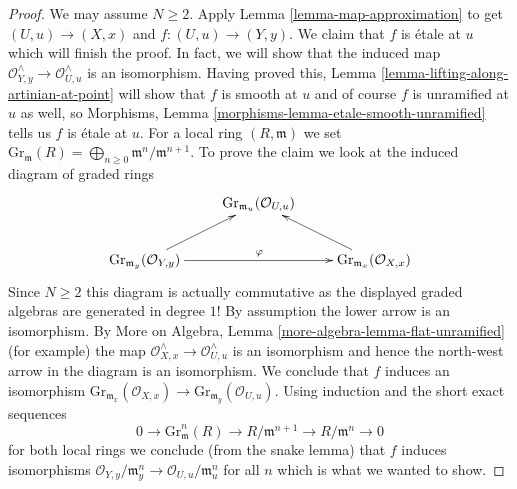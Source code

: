 \documentclass[10pt,a4paper]{amsart}
\theoremstyle{plain}
\theoremstyle{definition}
\theoremstyle{remark}
\numberwithin{equation}{subsection}
\begin{document}
\begin{proof}
We may assume $N \geq 2$. Apply Lemma \ref{lemma-map-approximation} to get
$(U, u) \to (X, x)$ and $f : (U, u) \to (Y, y)$.
We claim that $f$ is \'etale at $u$ which will finish the proof.
In fact, we will show that the induced map
$\mathcal{O}_{Y, y}^\wedge \to \mathcal{O}_{U, u}^\wedge$
is an isomorphism. Having proved this,
Lemma \ref{lemma-lifting-along-artinian-at-point}
will show that $f$ is smooth at $u$ and of course
$f$ is unramified at $u$ as well, so
Morphisms, Lemma \ref{morphisms-lemma-etale-smooth-unramified}
tells us $f$ is \'etale at $u$.
For a local ring $(R, \mathfrak m)$ we set
$\text{Gr}_\mathfrak m(R) =
\bigoplus_{n \geq 0} \mathfrak m^n/\mathfrak m^{n + 1}$.
To prove the claim we look at the induced diagram
of graded rings
$$
\xymatrix{
& \text{Gr}_{\mathfrak m_u}(\mathcal{O}_{U, u}) \\
\text{Gr}_{\mathfrak m_y}(\mathcal{O}_{Y, y}) \ar[rr]^\varphi \ar[ru] & &
\text{Gr}_{\mathfrak m_x}(\mathcal{O}_{X, x}) \ar[lu]
}
$$
Since $N \geq 2$ this diagram is actually commutative as the
displayed graded algebras are generated in degree $1$!
By assumption the lower arrow is an isomorphism.
By More on Algebra, Lemma \ref{more-algebra-lemma-flat-unramified}
(for example) the map
$\mathcal{O}_{X, x}^\wedge \to \mathcal{O}_{U, u}^\wedge$
is an isomorphism and hence the north-west arrow
in the diagram is an isomorphism. We conclude that
$f$ induces an isomorphism
$\text{Gr}_{\mathfrak m_x}(\mathcal{O}_{X, x}) \to
\text{Gr}_{\mathfrak m_y}(\mathcal{O}_{U, u})$.
Using induction and the short exact sequences
$$
0 \to \text{Gr}^n_{\mathfrak m}(R) \to R/\mathfrak m^{n + 1} \to
R/\mathfrak m^n \to 0
$$
for both local rings we conclude (from the snake lemma)
that $f$ induces isomorphisms
$\mathcal{O}_{Y, y}/\mathfrak m_y^n \to \mathcal{O}_{U, u}/\mathfrak m_u^n$
for all $n$ which is what we wanted to show.
\end{proof}
\end{document}
